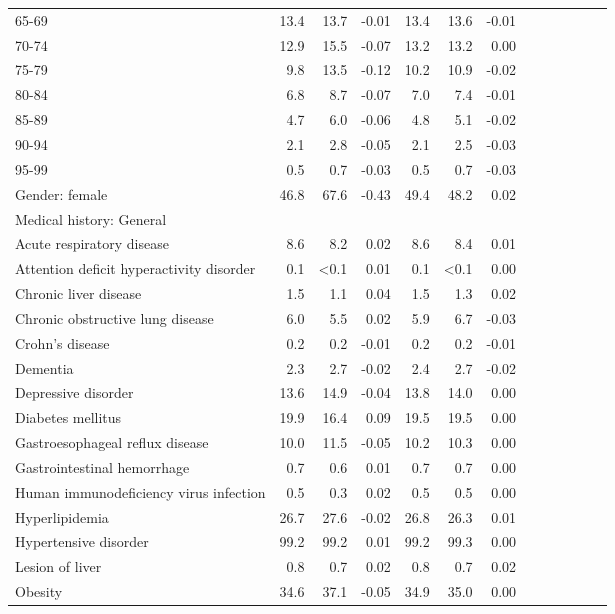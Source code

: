 \documentclass[11pt,]{article}
\begin{document}
\begin{longtable}{lrrrrrrrrrrrr}
      65-69 & 13.4 & 13.7 & -0.01 & 13.4 & 13.6 & -0.01 \\ 
      70-74 & 12.9 & 15.5 & -0.07 & 13.2 & 13.2 &  0.00 \\ 
      75-79 &  9.8 & 13.5 & -0.12 & 10.2 & 10.9 & -0.02 \\ 
      80-84 &  6.8 &  8.7 & -0.07 &  7.0 &  7.4 & -0.01 \\ 
      85-89 &  4.7 &  6.0 & -0.06 &  4.8 &  5.1 & -0.02 \\ 
      90-94 &  2.1 &  2.8 & -0.05 &  2.1 &  2.5 & -0.03 \\ 
      95-99 &  0.5 &  0.7 & -0.03 &  0.5 &  0.7 & -0.03 \\ 
  Gender: female & 46.8 & 67.6 & -0.43 & 49.4 & 48.2 &  0.02 \\ 
  Medical history: General &    &    &     &    &    &     \\ 
      Acute respiratory disease &  8.6 &  8.2 &  0.02 &  8.6 &  8.4 &  0.01 \\ 
      Attention deficit hyperactivity disorder &  0.1 & <0.1 &  0.01 &  0.1 & <0.1 &  0.00 \\ 
      Chronic liver disease &  1.5 &  1.1 &  0.04 &  1.5 &  1.3 &  0.02 \\ 
      Chronic obstructive lung disease &  6.0 &  5.5 &  0.02 &  5.9 &  6.7 & -0.03 \\ 
      Crohn's disease &  0.2 &  0.2 & -0.01 &  0.2 &  0.2 & -0.01 \\ 
      Dementia &  2.3 &  2.7 & -0.02 &  2.4 &  2.7 & -0.02 \\ 
      Depressive disorder & 13.6 & 14.9 & -0.04 & 13.8 & 14.0 &  0.00 \\ 
      Diabetes mellitus & 19.9 & 16.4 &  0.09 & 19.5 & 19.5 &  0.00 \\ 
      Gastroesophageal reflux disease & 10.0 & 11.5 & -0.05 & 10.2 & 10.3 &  0.00 \\ 
      Gastrointestinal hemorrhage &  0.7 &  0.6 &  0.01 &  0.7 &  0.7 &  0.00 \\ 
      Human immunodeficiency virus infection &  0.5 &  0.3 &  0.02 &  0.5 &  0.5 &  0.00 \\ 
      Hyperlipidemia & 26.7 & 27.6 & -0.02 & 26.8 & 26.3 &  0.01 \\ 
      Hypertensive disorder & 99.2 & 99.2 &  0.01 & 99.2 & 99.3 &  0.00 \\ 
      Lesion of liver &  0.8 &  0.7 &  0.02 &  0.8 &  0.7 &  0.02 \\ 
      Obesity & 34.6 & 37.1 & -0.05 & 34.9 & 35.0 &  0.00 \\ 

\end{longtable}
\end{document}
